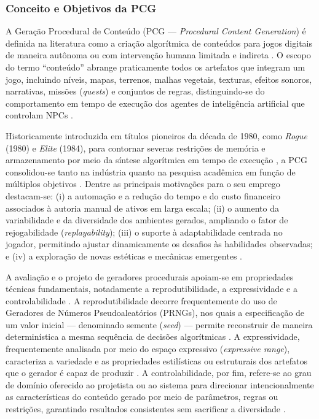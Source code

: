 \subsubsection{Conceito e Objetivos da PCG}
\label{sec:conceito_pcg}

A Geração Procedural de Conteúdo (PCG --- \textit{Procedural Content Generation}) é definida na literatura como a criação algorítmica de conteúdos para jogos digitais de maneira autônoma ou com intervenção humana limitada e indireta \cite{pcgbook, summerville2018procedural, maleki2024procedural}. O escopo do termo ``conteúdo'' abrange praticamente todos os artefatos que integram um jogo, incluindo níveis, mapas, terrenos, malhas vegetais, texturas, efeitos sonoros, narrativas, missões (\textit{quests}) e conjuntos de regras, distinguindo-se do comportamento em tempo de execução dos agentes de inteligência artificial que controlam NPCs \cite{pcgbook, summerville2018procedural, maleki2024procedural}.

Historicamente introduzida em títulos pioneiros da década de 1980, como \textit{Rogue} (1980) e \textit{Elite} (1984), para contornar severas restrições de memória e armazenamento por meio da síntese algorítmica em tempo de execução \cite{pcgbook, summerville2018procedural, araujo2018geracao}, a PCG consolidou-se tanto na indústria quanto na pesquisa acadêmica em função de múltiplos objetivos \cite{linden2014dungeons, pcgbook}. Dentre as principais motivações para o seu emprego destacam-se: (i) a automação e a redução do tempo e do custo financeiro associados à autoria manual de ativos em larga escala; (ii) o aumento da variabilidade e da diversidade dos ambientes gerados, ampliando o fator de rejogabilidade (\textit{replayability}); (iii) o suporte à adaptabilidade centrada no jogador, permitindo ajustar dinamicamente os desafios às habilidades observadas; e (iv) a exploração de novas estéticas e mecânicas emergentes \cite{linden2014dungeons, pcgbook, summerville2018procedural}.

A avaliação e o projeto de geradores procedurais apoiam-se em propriedades técnicas fundamentais, notadamente a reprodutibilidade, a expressividade e a controlabilidade \cite{tanagra, linden2014dungeons, maleki2024procedural}. A reprodutibilidade decorre frequentemente do uso de Geradores de Números Pseudoaleatórios (PRNGs), nos quais a especificação de um valor inicial --- denominado semente (\textit{seed}) --- permite reconstruir de maneira determinística a mesma sequência de decisões algorítmicas \cite{maleki2024procedural}. A expressividade, frequentemente analisada por meio do espaço expressivo (\textit{expressive range}), caracteriza a variedade e as propriedades estilísticas ou estruturais dos artefatos que o gerador é capaz de produzir \cite{tanagra, inproceedings}. A controlabilidade, por fim, refere-se ao grau de domínio oferecido ao projetista ou ao sistema para direcionar intencionalmente as características do conteúdo gerado por meio de parâmetros, regras ou restrições, garantindo resultados consistentes sem sacrificar a diversidade \cite{linden2014dungeons, shaker2016constructive}.

